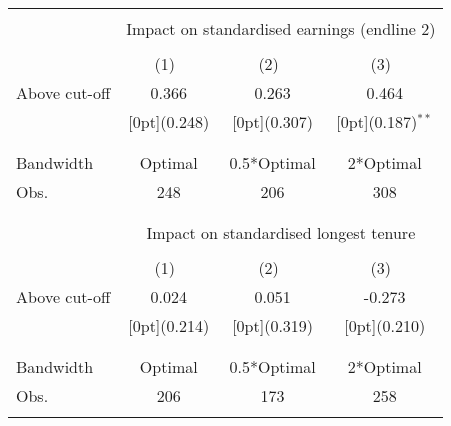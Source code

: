 
\begin{tabular*}{\textwidth}{@{\extracolsep{\fill}}lccc}
\hline
\mbox{} \\ 
& \multicolumn{3}{c}{Impact on standardised earnings (endline 2)} \\
\mbox{} \\ 
& \multicolumn{1}{c}{(1)\mbox{\ }} &        \multicolumn{1}{c}{(2)\mbox{\ }} &      \multicolumn{1}{c}{(3)\mbox{\ }}    \\
\noalign{\smallskip}\hline \noalign{\smallskip}
 Above cut-off & 0.366 &  0.263 & 0.464   \\
               & \raisebox{.7ex}[0pt]{\scriptsize (0.248)} &  \raisebox{.7ex}[0pt]{\scriptsize (0.307)} & \raisebox{.7ex}[0pt]{\scriptsize (0.187)$^{**}$}    \\
 \mbox{}\\
 \hline
 \mbox{}\\
 Bandwidth     & Optimal &  0.5*Optimal & 2*Optimal    \\
  Obs.                 & 248 &  206 & 308  \\
\mbox{}\\
\hline
\mbox{} \\ 
& \multicolumn{3}{c}{Impact on standardised longest tenure} \\
\mbox{} \\ 
& \multicolumn{1}{c}{(1)\mbox{\ }} &        \multicolumn{1}{c}{(2)\mbox{\ }} &      \multicolumn{1}{c}{(3)\mbox{\ }}    \\
\noalign{\smallskip}\hline \noalign{\smallskip}
 Above cut-off & 0.024 &  0.051 & -0.273   \\
               & \raisebox{.7ex}[0pt]{\scriptsize (0.214)} &  \raisebox{.7ex}[0pt]{\scriptsize (0.319)} & \raisebox{.7ex}[0pt]{\scriptsize (0.210)}    \\
 \mbox{}\\
 \hline
 \mbox{}\\
 Bandwidth     & Optimal &  0.5*Optimal & 2*Optimal    \\
  Obs.                 & 206 &  173 & 258  \\
\mbox{}\\
\hline
\end{tabular*}%